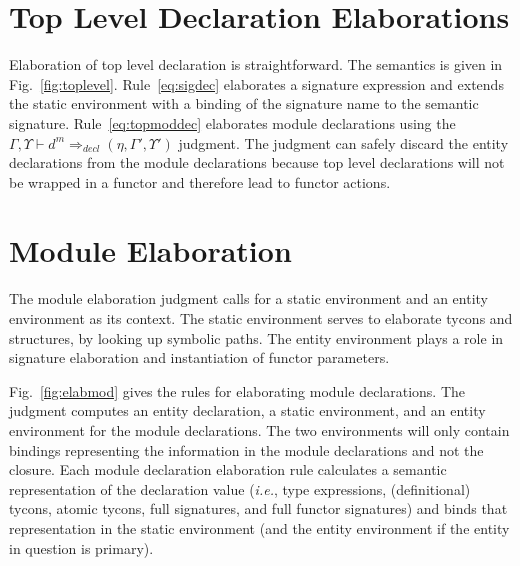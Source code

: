 \section{Top Level Declaration Elaborations}



Elaboration of top level declaration is
straightforward. The semantics is given in Fig.~\ref{fig:toplevel}. Rule~\ref{eq:sigdec} elaborates a signature
expression and extends the static environment with a binding of the
signature name to the semantic signature. Rule~\ref{eq:topmoddec}
elaborates module declarations using the $\Gamma,\Upsilon\vdash d^m
\Rightarrow_{decl} (\eta,\Gamma',\Upsilon')$ judgment. The judgment
can safely discard the entity declarations from the module
declarations because top level declarations will not be wrapped in a
functor and therefore lead to functor actions. 

\section{Module Elaboration}\label{sec:modelab}



The module elaboration judgment calls for a static environment and an entity environment as its context. The static environment serves to elaborate tycons and structures, by looking up symbolic paths. The entity environment plays a role in signature elaboration and instantiation of functor parameters. 

Fig.~\ref{fig:elabmod} gives the rules for elaborating module declarations. The judgment computes an entity declaration, a static environment, and an entity environment for the module declarations. The two environments will only contain bindings representing the information in the module declarations and not the closure. Each module declaration elaboration rule calculates a semantic representation of the declaration value (\emph{i.e.}, type expressions, (definitional) tycons, atomic tycons, full signatures, and full functor signatures) and binds that representation in the static environment (and the entity environment if the entity in question is primary). 

